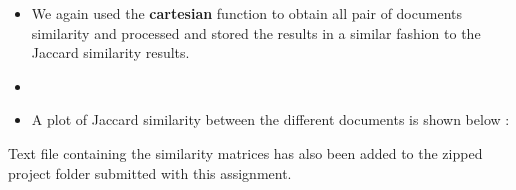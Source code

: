 \documentclass[11pt]{article}
\begin{document}
\begin{itemize}
\begin{itemize}
\item We again used the \textbf{cartesian} function to obtain all pair of documents similarity and processed and stored the results in a similar fashion to the Jaccard similarity results.

\item[] \item[] A plot of Jaccard similarity between the different documents is shown below :



\end{itemize}


Text file containing the similarity matrices has also been added to the zipped project folder submitted with this assignment.

\end{itemize}
\end{document}
